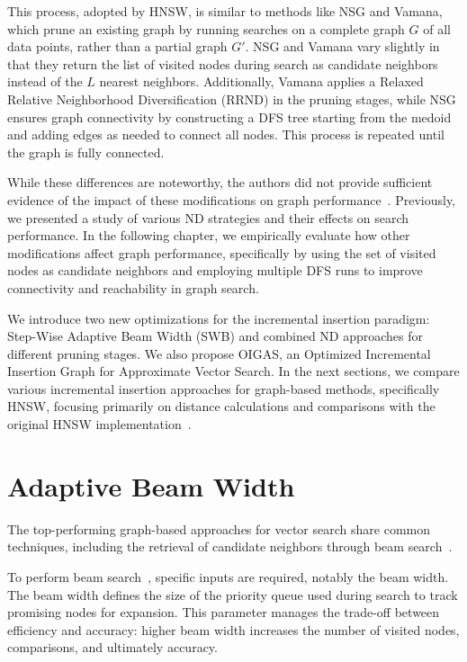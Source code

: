 This process, adopted by HNSW, is similar to methods like NSG and Vamana, which prune an existing graph by running searches on a complete graph \( G \) of all data points, rather than a partial graph \( G' \). NSG and Vamana vary slightly in that they return the list of visited nodes during search as candidate neighbors instead of the \( L \) nearest neighbors. Additionally, Vamana applies a Relaxed Relative Neighborhood Diversification (RRND) in the pruning stages, while NSG ensures graph connectivity by constructing a DFS tree starting from the medoid and adding edges as needed to connect all nodes. This process is repeated until the graph is fully connected.

While these differences are noteworthy, the authors did not provide sufficient evidence of the impact of these modifications on graph performance~\cite{nsg,vamana}. Previously, we presented a study of various ND strategies and their effects on search performance. In the following chapter, we empirically evaluate how other modifications affect graph performance, specifically by using the set of visited nodes as candidate neighbors and employing multiple DFS runs to improve connectivity and reachability in graph search.

We introduce two new optimizations for the incremental insertion paradigm: Step-Wise Adaptive Beam Width (SWB) and combined ND approaches for different pruning stages. We also propose OIGAS, an Optimized Incremental Insertion Graph for Approximate Vector Search. In the next sections, we compare various incremental insertion approaches for graph-based methods, specifically HNSW, focusing primarily on distance calculations and comparisons with the original HNSW implementation~\cite{url/hnsw}.



\section{Adaptive Beam Width}
The top-performing graph-based approaches for vector search share common techniques, including the retrieval of candidate neighbors through beam search~\cite{hnsw,nsg,vamana,SPTAG4,elpis}.

To perform beam search~\cite{beamsearch}, specific inputs are required, notably the beam width. The beam width defines the size of the priority queue used during search to track promising nodes for expansion. This parameter manages the trade-off between efficiency and accuracy: higher beam width increases the number of visited nodes, comparisons, and ultimately accuracy.

